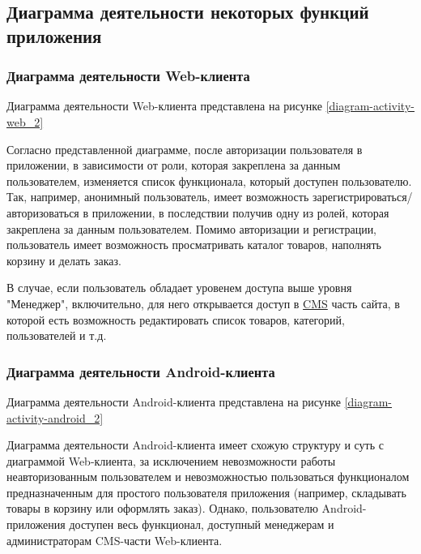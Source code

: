 \subsection{Диаграмма деятельности некоторых функций приложения}\label{subsec:2-activity-diagram}\indent


\subsubsection{Диаграмма деятельности Web-клиента}\indent

Диаграмма деятельности Web-клиента представлена на рисунке \ref{diagram-activity-web_2}
\clearpage
\begin{sidewaysfigure}

\end{sidewaysfigure}
\clearpage

Согласно представленной диаграмме, после авторизации пользователя в приложении, в зависимости от роли, которая закреплена за данным пользователем, изменяется список функционала, 
который доступен пользователю.
Так, например, анонимный пользователь, имеет возможность зарегистрироваться/авторизоваться в приложении, в последствии получив одну из ролей, которая закреплена за данным пользователем.
Помимо авторизации и регистрации, пользователь имеет возможность просматривать каталог товаров, наполнять корзину и делать заказ.

В случае, если пользователь обладает уровенем доступа выше уровня "Менеджер", включительно, для него открывается доступ в \hyperlink{gloss:cms}{CMS} часть сайта, 
в которой есть возможность редактировать список товаров, категорий, пользователей и т.д.


\subsubsection{Диаграмма деятельности Android-клиента}\indent

Диаграмма деятельности Android-клиента представлена на рисунке \ref{diagram-activity-android_2}

\clearpage
\begin{sidewaysfigure}

\end{sidewaysfigure}
\clearpage

Диаграмма деятельности Android-клиента имеет схожую структуру и суть с диаграммой Web-клиента, за исключением невозможности работы неавторизованным пользователем 
и невозможностью пользоваться функционалом предназначенным для простого пользователя приложения (например, складывать товары в корзину или оформлять заказ). 
Однако, пользователю Android-приложения доступен весь функционал, доступный менеджерам и администраторам CMS-части Web-клиента. 
